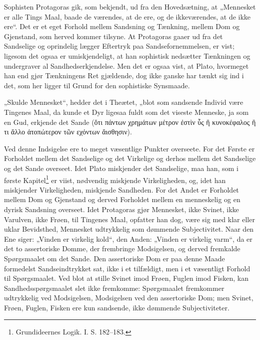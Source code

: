 \documentclass[12pt]{book}
\newcommand{\opage}[1]{\marginnote{\footnotesize\textit{[#1]}}}
\begin{document}
Sophisten Protagoras gik, som bekjendt, ud fra den
Hovedsætning, at „Mennesket er alle Tings Maal, baade de
værendes, at de ere, og de ikkeværendes, at de ikke ere“. Det
er et eget Forhold mellem Sandsning og Tænkning, mellem
Dom og Gjenstand, som herved kommer tilsyne. At Protagoras
gaaer ud fra det Sandselige og oprindelig lægger
Eftertryk paa Sandsefornemmelsen, er vist; ligesom det ogsaa
er umiskjendeligt, at han sophistisk nedsætter Tænkningen og
undergraver al Sandhedserkjendelse. Men det er ogsaa vist,
at Plato, hvormeget han end gjør Tænkningens Ret gjældende,
\opage{184}dog ikke ganske har tænkt sig ind i det, som her ligger til
Grund for den sophistiske Synsmaade.

„Skulde Mennesket“, hedder det i Theætet, „blot som
sandsende Individ være Tingenes Maal, da kunde et Dyr
ligesaa fuldt som det viseste Menneske, ja som en Gud, erkjende
det Sande (ὅτι πάντων χρημάτων μέτρον ἐστὶν ὗς ἢ
κυνοκέφαλος ἢ τι ἄλλο ἀτοπώτερον τῶν εχόντων
ἄισθησιν).

Ved denne Indsigelse ere to meget væsentlige Punkter
overseete. For det Første er Forholdet mellem det Sandselige
og det Virkelige og derhos mellem det Sandselige og det Sande
overseet. Idet Plato miskjender det Sandselige, maa han,
som i første Kapitel\footnote{Grundideernes Logik. I. S. 182--183.} %
er viist, nødvendig miskjende Virkeligheden,
og, idet han miskjender Virkeligheden, miskjende Sandheden.
For det Andet er Forholdet mellem Dom og Gjenstand
og derved Forholdet mellem en menneskelig og en dyrisk
Sandsning overseet. Idet Protagoras gjør Mennesket, ikke
Svinet, ikke Varulven, ikke Frøen, til Tingenes Maal, opfatter
han dog, være sig med klar eller uklar Bevidsthed,
Mennesket udtrykkelig som dømmende Subjectivitet. Naar den
Ene siger: „Vinden er virkelig kold“, den Anden: „Vinden er
virkelig varm“, da er det to assertoriske Domme, der frembringe
Modsigelsen, og derved fremkalde Spørgsmaalet om
det Sande. Den assertoriske Dom er paa denne Maade
formedelst Sandseindtrykket sat, ikke i et tilfældigt, men i et
væsentligt Forhold til Spørgsmaalet. Ved blot at stille
Svinet imod Frøen, Fuglen imod Fisken, kan Sandhedsspørgsmaalet
slet ikke fremkomme: Spørgsmaalet fremkommer
udtrykkelig ved Modsigelsen, Modsigelsen ved den assertoriske
Dom; men Svinet, Frøen, Fuglen, Fisken ere kun sandsende,
ikke dømmende Subjectiviteter.
\end{document}
